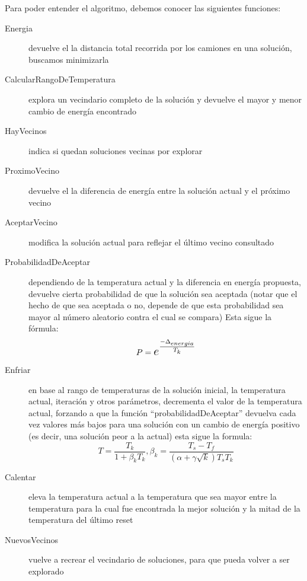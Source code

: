 Para poder entender el algoritmo, debemos conocer las siguientes funciones:

\begin{description}
\item[Energia] devuelve el la distancia total recorrida por los camiones en una solución, buscamos minimizarla

\item[CalcularRangoDeTemperatura] explora un vecindario completo de la solución y devuelve el mayor y menor cambio de energía encontrado

\item[HayVecinos] indica si quedan soluciones vecinas por explorar

\item[ProximoVecino] devuelve el la diferencia de energía entre la solución actual y el próximo vecino

\item[AceptarVecino] modifica la solución actual para reflejar el último vecino consultado

\item[ProbabilidadDeAceptar] dependiendo de la temperatura actual y la diferencia en energía propuesta, devuelve cierta probabilidad de que la solución sea aceptada (notar que el hecho de que sea aceptada o no, depende de que esta probabilidad sea mayor al número aleatorio contra el cual se compara) Esta sigue la fórmula:
$$ P = \mathlarger{\mathlarger{e^\frac{-\Delta_{energia}}{T_k}}} $$

\item[Enfriar] en base al rango de temperaturas de la solución inicial, la temperatura actual, iteración y otros parámetros, decrementa el valor de la temperatura actual, forzando a que la función “probabilidadDeAceptar” devuelva cada vez valores más bajos para una solución con un cambio de energía positivo (es decir, una solución peor a la actual)
esta sigue la formula: 
$$ T = \frac{T_k}{1+ \beta_k T_k},  \beta_k = \frac{T_s - T_f}{(\alpha + \gamma \sqrt{k} )T_s T_k} $$

\item[Calentar] eleva la temperatura actual a la temperatura que sea mayor entre la temperatura para la cual fue encontrada la mejor solución y la mitad de la temperatura del último reset

\item[NuevosVecinos] vuelve a recrear el vecindario de soluciones, para que pueda volver a ser explorado
\end{description}

